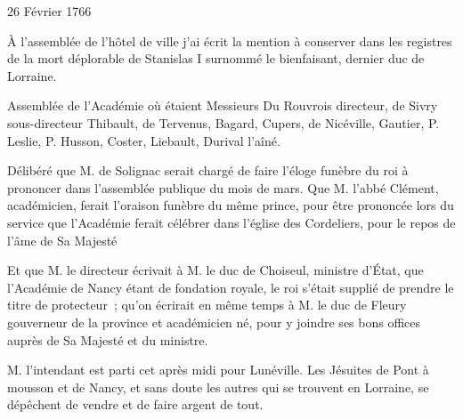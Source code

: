                      \begin{diary}{26 Février 1766}{}
                        
                         À l'assemblée de l'hôtel de ville j'ai écrit la
                           mention à conserver dans les registres
                           de la mort déplorable de Stanislas I surnommé
                              le bienfaisant, dernier duc de Lorraine. \bigskip
        
        
                         Assemblée de l'Académie où étaient Messieurs
                           Du Rouvrois
                           directeur, de Sivry
                           sous-directeur
                           Thibault,
                           de Tervenus, Bagard, Cupers, de
                           Nicéville,
                           Gautier, P. Leslie, P. Husson,
                              Coster, Liebault,
                           Durival l'aîné. \bigskip
        
        
                         Délibéré que M. de Solignac serait chargé
                           de faire l'éloge funèbre du
                              roi à prononcer
                           dans l'assemblée publique du mois de
                              mars.
                           Que M. l'abbé Clément,
                           académicien, ferait
                           l'oraison funèbre du même prince, pour être
                           prononcée lors du service que l'Académie
                           ferait célébrer dans l’église
                              des Cordeliers,
                           pour le repos de l'âme de Sa Majesté
                        \bigskip
        
        
                         Et que M. le directeur écrivait à M.
                              le duc de Choiseul,
                           ministre d’État, que l'Académie
                              de Nancy étant de fondation royale, le roi
                           s'était supplié de prendre le titre de protecteur ;
                           qu'on écrirait en même temps à M. le duc de
                              Fleury gouverneur de la province et académicien
                           né, pour y joindre ses bons offices auprès de
                           Sa Majesté et du ministre. \bigskip
        
        
                        
                           M. l'intendant est parti cet après
                           midi
                           pour Lunéville.
                           Les Jésuites de Pont à mousson et de
                              Nancy, et sans
                           doute les autres qui se trouvent en Lorraine,
                           se dépêchent de vendre et de faire argent de tout. \bigskip
        
        
                     \end{diary}

